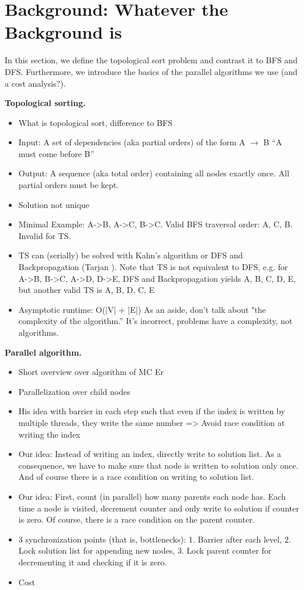 \documentclass[letterpaper]{article}
\newcommand{\mypar}[1]{{\bf #1.}}
\begin{document}
\section{Background: Whatever the Background is}\label{sec:background}
 In this section, we define the topological sort problem and contrast it to BFS and DFS.
 Furthermore, we introduce the basics of the parallel algorithms we use (and a cost analysis?).
 
 \begin{invisible}
 \mypar{Topological sorting}
 \begin{itemize}
  \item What is topological sort, difference to BFS
  \item Input: A set of dependencies (aka partial orders) of the form A $\rightarrow$ B ``A must come before B''
  \item Output: A sequence (aka total order) containing all nodes exactly once. All partial orders must be kept.
  \item Solution not unique
  \item Minimal Example: A->B, A->C, B->C. Valid BFS traversal order: A, C, B. Invalid for TS.
  \item TS can (serially) be solved with Kahn's algorithm \cite{kahn1962topological} or DFS and Backpropagation (Tarjan \cite{tarjan1976edge}).
        Note that TS is not equivalent to DFS, e.g. for A->B, B->C, A->D, D->E, DFS and Backpropagation yields A, B, C, D, E, but another valid TS is A, B, D, C, E
  \item Asymptotic runtime: O(|V| + |E|)
As an aside, don't talk about "the complexity of the algorithm.'' It's incorrect,
problems have a complexity, not algorithms.  
 \end{itemize}

 \mypar{Parallel algorithm}
 \begin{itemize}
  \item Short overview over algorithm of MC Er
  \item Parallelization over child nodes
  \item His idea with barrier in each step such that even if the index is written by multiple threads, they write the same number => Avoid race condition at writing the index
  \item Our idea: Instead of writing an index, directly write to solution list. As a consequence, we have to make sure that node is written to solution only once. And of course there is a race condition on writing to solution list.
  \item Our idea: First, count (in parallel) how many parents each node has. Each time a node is visited, decrement counter and only write to solution if counter is zero. Of course, there is a race condition on the parent counter.
  \item 3 synchronization points (that is, bottlenecks): 1. Barrier after each level, 2. Lock solution list for appending new nodes, 3. Lock parent counter for decrementing it and checking if it is zero.
  \item Cost
 \end{itemize}

 
\end{invisible}
\end{document}

